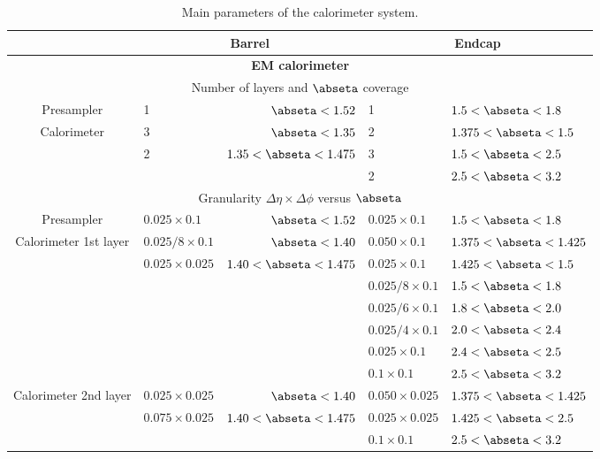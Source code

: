 \documentclass[cernpreprint, atlasdraft=false, UKenglish,british,orcidlogo, texmf, orcidlogo]{atlasdoc}
\begin{document}
\begin{table}
\scriptsize
\begin{center}
\caption{Main parameters of the calorimeter system.}
\label{tab:overview-calo-parameters}
\begin{tabular}{|c|l r|l l|}
\hline
&  \multicolumn{2}{c|}{\textbf{Barrel}}  & \multicolumn{2}{c|}{\textbf{Endcap}}  \\
\hline
\hline
\multicolumn{5}{|c|}{{\textbf{\gls{EM} calorimeter }}} \\
\hline
\multicolumn{5}{|c|}{Number of layers and $\abseta$ coverage} \\
\hline
Presampler &  1 &  $\abseta<1.52$ & 1 & $1.5<\abseta<1.8$ \\
\hline
Calorimeter & 3 & $\abseta<1.35$           & 2 & $1.375<\abseta<1.5$ \\
& 2 & $1.35<\abseta<1.475$     & 3 & $1.5<\abseta<2.5$ \\
&   &                         & 2 & $2.5<\abseta<3.2$ \\
\hline
\multicolumn{5}{|c|}{Granularity $\Delta\eta\times\Delta\phi$ versus $\abseta$}
\\
\hline
Presampler &  $0.025\times 0.1$ & $\abseta<1.52$ &  $0.025\times 0.1$ &
$1.5<\abseta<1.8$\\
\hline
Calorimeter 1st layer &  $0.025/8\times 0.1$ & $\abseta<1.40$
& $0.050\times 0.1$ & $1.375<\abseta<1.425$   \\
&  $0.025\times 0.025$ & $1.40<\abseta<1.475$
& $0.025\times 0.1$ & $1.425<\abseta<1.5$ \\
&    &                          & $0.025/8\times 0.1$ & $1.5<\abseta<1.8$ \\
&    &                          & $0.025/6\times 0.1$ & $1.8<\abseta<2.0$ \\
&    &                          & $0.025/4\times 0.1$ & $2.0<\abseta<2.4$ \\
&    &                          & $0.025\times 0.1$ & $2.4<\abseta<2.5$ \\
&   &                          & $0.1\times 0.1$ & $2.5<\abseta<3.2$ \\
\hline
Calorimeter 2nd layer   &  $0.025\times 0.025$ & $\abseta<1.40$
& $0.050\times 0.025$ & $1.375<\abseta<1.425$ \\
& $0.075\times 0.025$ & $1.40<\abseta<1.475$
& $0.025\times 0.025$ & $1.425<\abseta<2.5$ \\
&     &                         & $0.1\times 0.1$ & $2.5<\abseta<3.2$ \\
\hline

\end{tabular}
\end{center}
\end{table}
\end{document}
